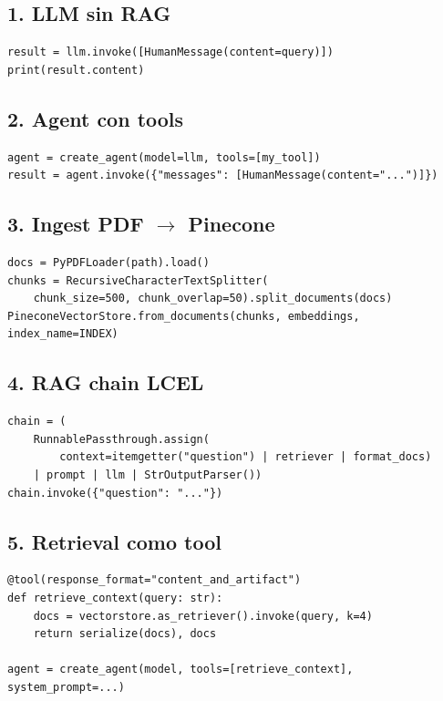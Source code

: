 \documentclass[11pt,a4paper]{article}
\begin{document}
\subsection{1. LLM sin RAG}
\begin{lstlisting}
result = llm.invoke([HumanMessage(content=query)])
print(result.content)
\end{lstlisting}

\subsection{2. Agent con tools}
\begin{lstlisting}
agent = create_agent(model=llm, tools=[my_tool])
result = agent.invoke({"messages": [HumanMessage(content="...")]})
\end{lstlisting}

\subsection{3. Ingest PDF $\to$ Pinecone}
\begin{lstlisting}
docs = PyPDFLoader(path).load()
chunks = RecursiveCharacterTextSplitter(
    chunk_size=500, chunk_overlap=50).split_documents(docs)
PineconeVectorStore.from_documents(chunks, embeddings, index_name=INDEX)
\end{lstlisting}

\subsection{4. RAG chain LCEL}
\begin{lstlisting}
chain = (
    RunnablePassthrough.assign(
        context=itemgetter("question") | retriever | format_docs)
    | prompt | llm | StrOutputParser())
chain.invoke({"question": "..."})
\end{lstlisting}

\subsection{5. Retrieval como tool}
\begin{lstlisting}
@tool(response_format="content_and_artifact")
def retrieve_context(query: str):
    docs = vectorstore.as_retriever().invoke(query, k=4)
    return serialize(docs), docs

agent = create_agent(model, tools=[retrieve_context], system_prompt=...)
\end{lstlisting}
\end{document}
